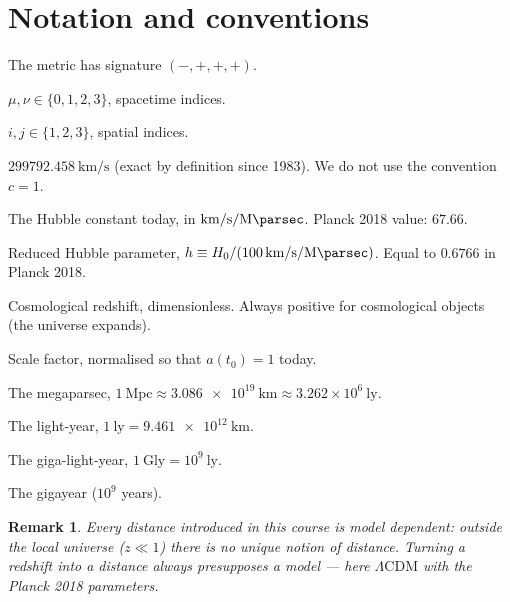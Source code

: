 \documentclass[11pt,a4paper,openany]{report}
\newcommand{\Mpc}{\text{Mpc}}
\newcommand{\Gyr}{\text{Gyr}}
\newcommand{\ly}{\text{ly}}
\newcommand{\Gly}{\text{Gly}}
\newcommand{\Hzero}{H_{0}}
\newtheorem{remark}[theorem]{Remark}
\begin{document}
\chapter*{Notation and conventions}

\begin{description}[leftmargin=2.4cm,labelwidth=2.2cm]
\item[Signature] The metric has signature $(-,+,+,+)$.
\item[Greek indices] $\mu,\nu \in \{0,1,2,3\}$, spacetime indices.
\item[Latin indices] $i,j \in \{1,2,3\}$, spatial indices.
\item[$c$] $\SI{299792.458}{\km\per\second}$ (exact by definition since 1983).
  We do not use the convention $c=1$.
\item[$\Hzero$] The Hubble constant today, in
  $\si{\km\per\second\per\mega\parsec}$. Planck 2018 value: $67.66$.
\item[$h$] Reduced Hubble parameter, $h \equiv \Hzero / (\SI{100}{\km\per\second\per\mega\parsec})$.
  Equal to $0.6766$ in Planck 2018.
\item[$z$] Cosmological redshift, dimensionless. Always positive for
  cosmological objects (the universe expands).
\item[$a(t)$] Scale factor, normalised so that $a(t_0) = 1$ today.
\item[$\Mpc$] The megaparsec, $1~\Mpc \approx \SI{3.086e19}{\km}
  \approx 3.262 \times 10^{6}~\ly$.
\item[$\ly$] The light-year, $1~\ly = \SI{9.461e12}{\km}$.
\item[$\Gly$] The giga-light-year, $1~\Gly = 10^{9}~\ly$.
\item[$\Gyr$] The gigayear ($10^{9}$ years).
\end{description}

\begin{remark}
Every distance introduced in this course is \emph{model dependent}: outside the
local universe ($z\ll 1$) there is no unique notion of distance. Turning a
redshift into a distance always presupposes a model --- here
$\Lambda\text{CDM}$ with the Planck 2018 parameters.
\end{remark}

\clearpage

\end{document}
